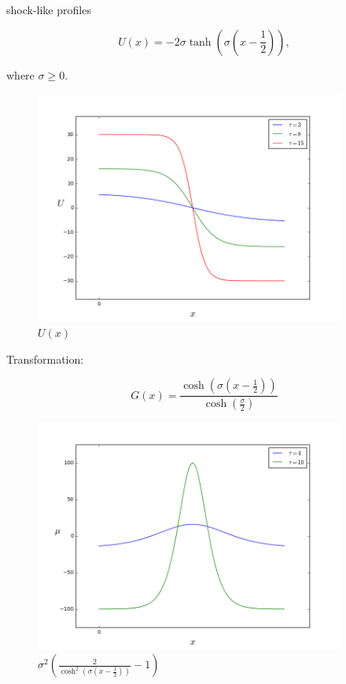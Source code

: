 \documentclass[a4:paper,14pt]{article}
\begin{document}
shock-like profiles

\begin{equation}\label{shock_like}
  U(x) = -2\sigma\tanh{(\sigma(x - \frac{1}{2}))},
\end{equation}

where $\sigma \ge 0$.



\begin{figure}[h]
  \centering
  \includegraphics[width=4in]{fig1}
  \caption{$U(x)$}
\end{figure}

Transformation: 

\begin{equation}
  G(x) = \frac{\cosh(\sigma(x - \frac{1}{2}))}{\cosh(\frac{\sigma}{2})}
\end{equation}

\begin{figure}[h]
  \centering
  \includegraphics[width=4in]{fig2}
  \caption{$\sigma^2 \left( \frac{2}{\cosh^2(\sigma(x - \frac{1}{2}))} - 1 \right)$}
\end{figure}
\end{document}
